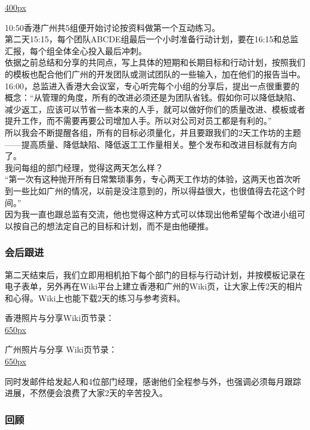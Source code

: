 \href{文件:FS_opening_handout_Screenshot_2024-11-30_211129.jpg}{400px}

10:50香港广州共5组便开始讨论按资料做第一个互动练习。\\
第二天15:15，每个团队ABCDE组最后一个小时准备行动计划，要在16:15和总监汇报，每个组全体全心投入最后冲刺。\\
依据之前总结和分享的共同点，写上具体的短期和长期目标和行动计划，按照我们的模板也配合他们广州的开发团队或测试团队的一些输入，加在他们的报告当中。\\
16:00，总监进入香港大会议室，专心听完每个小组的分享后，提出一点很重要的概念：``从管理的角度，所有的改进必须还是为团队省钱。假如你可以降低缺陷、减少返工，应该可以节省一些本来的人手，就可以做好你们的质量改进、模板或者提升工作，而不需要再要公司增加人手。所以对公司对员工都是有利的。''\\
所以我会不断提醒各组，所有的目标必须量化，并且要跟我们的2天工作坊的主题------提高质量、降低缺陷、降低返工工作量相关。整个发布和改进目标就有方向了。\\
我问每组的部门经理，觉得这两天怎么样？\\
``第一次有这种抛开所有日常繁琐事务，专心两天工作坊的体验，这两天也首次听到一些比如广州的情况，以前是没注意到的，所以得益很大，也很值得去花这个时间。''\\
因为我一直也跟总监有交流，他也觉得这种方式可以体现出他希望每个改进小组可以按自己的想法定自己的目标和计划，而不是由他硬推。

\hypertarget{ux4f1aux540eux8ddfux8fdb}{%
\subsubsection{会后跟进}\label{ux4f1aux540eux8ddfux8fdb}}

第二天结束后，我们立即用相机拍下每个部门的目标与行动计划，并按模板记录在电子表单，另外再在Wiki平台上建立香港和广州的Wiki页，让大家上传2天的相片和心得。Wiki上也能下载2天的练习与参考资料。

香港照片与分享Wiki页节录：\\
\href{文件:Hk_LL_Screenshot_2024-12-01_090728.jpg}{650px}

广州照片与分享 Wiki页节录：\\
\href{文件:Gz_LL_Screenshot_2024-12-01_091249.jpg}{650px}

同时发邮件给发起人和4位部门经理，感谢他们全程参与外，也强调必须每月跟踪进展，不然便会浪费了大家2天的辛苦投入。

\hypertarget{ux56deux987e}{%
\subsubsection{回顾}\label{ux56deux987e}}

